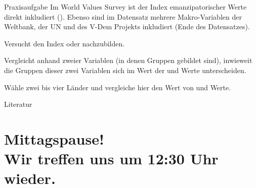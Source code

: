 \documentclass[11pt]{beamer}
\begin{document}
\begin{frame}{Praxisaufgabe}
Im World Values Survey ist der Index emanzipatorischer Werte direkt inkludiert (). Ebenso sind im Datensatz mehrere Makro-Variablen der Weltbank, der UN und des V-Dem Projekts inkludiert (Ende des Datensatzes).

	\begin{nolist}
		\item Versucht den Index  oder  nachzubilden. 
		\item Vergleicht anhand zweier Variablen (in denen Gruppen gebildet sind), inwieweit die Gruppen dieser zwei Variablen sich im Wert der  und  Werte unterscheiden. 
		\item Wähle zwei bis vier Länder und vergleiche hier den Wert von  und  Werte. 
	\end{nolist}
\end{frame}

\renewcommand*{\bibfont}{\scriptsize}

\begin{frame}[allowframebreaks]{Literatur}
	\nocite{*}
	\printbibliography[heading = none]
\end{frame}



\section{Mittagspause! \\ Wir treffen uns um 12:30 Uhr wieder.}
\end{document}
